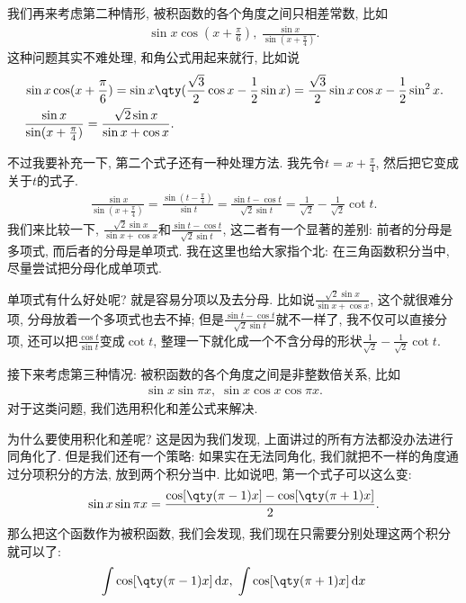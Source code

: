 \documentclass{ctexbook}
\newcommand*{\dif}{\mathop{}\!\mathrm{d}}
\begin{document}
{我们再来考虑第二种情形, 被积函数的各个角度之间只相差常数, 比如
\begin{align*}
\sin{x}\cos(x+\frac{\pi}{6}),\;\frac{\sin{x}}{\sin(x+\frac{\pi}{4})}
.\end{align*}
这种问题其实不难处理, 和角公式用起来就行, 比如说
\begin{align*}
{}&\sin{x}\cos(x+\frac{\pi}{6})=\sin{x}\qty(\frac{\sqrt{3}}{2}\cos{x}-\frac{1}{2}\sin{x})=\frac{\sqrt{3}}{2}\sin{x}\cos{x}-\frac{1}{2}\sin^{2}{x}.\\
{}&\frac{\sin{x}}{\sin(x+\frac{\pi}{4})}=\frac{\sqrt{2}\sin{x}}{\sin{x}+\cos{x}}
.\end{align*}\par
不过我要补充一下, 第二个式子还有一种处理方法. 我先令$t=x+\frac{\pi}{4}$, 然后把它变成关于$t$的式子. 
\begin{align*}
\frac{\sin{x}}{\sin(x+\frac{\pi}{4})}=\frac{\sin(t-\frac{\pi}{4})}{\sin{t}}=\frac{\sin{t}-\cos{t}}{\sqrt{2}\sin{t}}=\frac{1}{\sqrt{2}}-\frac{1}{\sqrt{2}}\cot{t}
.\end{align*}
我们来比较一下, $\frac{\sqrt{2}\sin{x}}{\sin{x}+\cos{x}}$和$\frac{\sin{t}-\cos{t}}{\sqrt{2}\sin{t}}$, 这二者有一个显著的差别: 前者的分母是多项式, 而后者的分母是单项式. 我在这里也给大家指个北: 在三角函数积分当中, 尽量尝试把分母化成单项式. \par
单项式有什么好处呢? 就是容易分项以及去分母. 比如说$\frac{\sqrt{2}\sin{x}}{\sin{x}+\cos{x}}$, 这个就很难分项, 分母放着一个多项式也去不掉; 但是$\frac{\sin{t}-\cos{t}}{\sqrt{2}\sin{t}}$就不一样了, 我不仅可以直接分项, 还可以把$\frac{\cos{t}}{\sin{t}}$变成$\cot{t}$, 整理一下就化成一个不含分母的形状$\frac{1}{\sqrt{2}}-\frac{1}{\sqrt{2}}\cot{t}$. \par
接下来考虑第三种情况: 被积函数的各个角度之间是非整数倍关系, 比如
\begin{align*}
\sin{x}\sin{\pi x},\;\sin{x}\cos{x}\cos{\pi x}
.\end{align*}
对于这类问题, 我们选用积化和差公式来解决. \par
为什么要使用积化和差呢? 这是因为我们发现, 上面讲过的所有方法都没办法进行同角化了. 但是我们还有一个策略: 如果实在无法同角化, 我们就把不一样的角度通过分项积分的方法, 放到两个积分当中. 比如说吧, 第一个式子可以这么变: 
\begin{align*}
\sin{x}\sin{\pi x}=\frac{\cos[\qty(\pi-1)x]-\cos[\qty(\pi+1)x]}{2}
.\end{align*}
那么把这个函数作为被积函数, 我们会发现, 我们现在只需要分别处理这两个积分就可以了: 
\begin{align*}
\int\cos[\qty(\pi-1)x]\dif{x},\;\int\cos[\qty(\pi+1)x]\dif{x}

\end{align*}}
\end{document}

